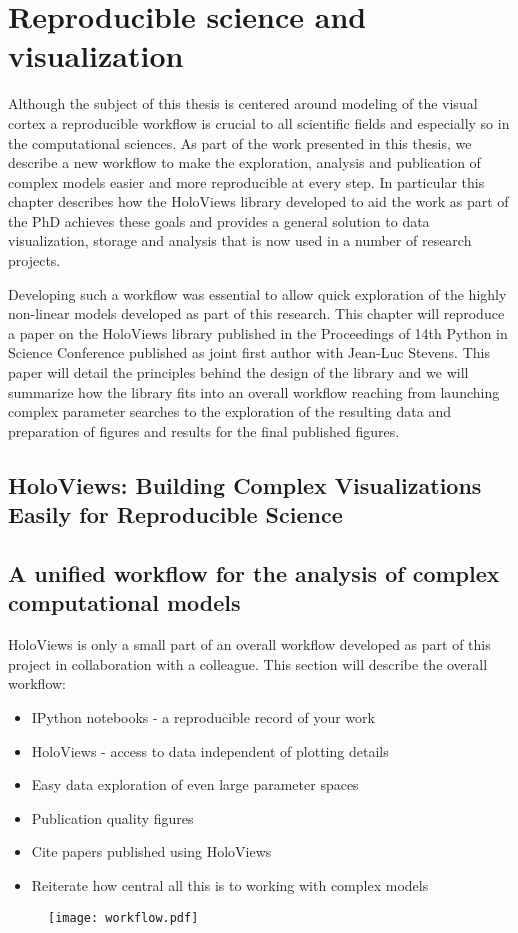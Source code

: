 \chapter{Reproducible science and visualization}

Although the subject of this thesis is centered around modeling of the
visual cortex a reproducible workflow is crucial to all scientific
fields and especially so in the computational sciences. As part of the
work presented in this thesis, we describe a new workflow to make the
exploration, analysis and publication of complex models easier and
more reproducible at every step. In particular this chapter describes
how the HoloViews library developed to aid the work as part of the PhD
achieves these goals and provides a general solution to data
visualization, storage and analysis that is now used in a number of
research projects.

Developing such a workflow was essential to allow quick exploration of
the highly non-linear models developed as part of this research.  This
chapter will reproduce a paper on the HoloViews library published in
the Proceedings of 14th Python in Science Conference published as
joint first author with Jean-Luc Stevens. This paper will detail the
principles behind the design of the library and we will summarize how
the library fits into an overall workflow reaching from launching
complex parameter searches to the exploration of the resulting data
and preparation of figures and results for the final published
figures.

\section{HoloViews: Building Complex Visualizations Easily for Reproducible Science}



\section{A unified workflow for the analysis of complex computational models}

HoloViews is only a small part of an overall workflow developed as
part of this project in collaboration with a colleague. This section
will describe the overall workflow:

\begin{itemize}
\item IPython notebooks - a reproducible record of your work
\item HoloViews - access to data independent of plotting details
\item Easy data exploration of even large parameter spaces
\item Publication quality figures
\item Cite papers published using HoloViews
\item Reiterate how central all this is to working with complex models
\end{itemize}

\begin{figure}
	\centering
        \texttt{[image: workflow.pdf]}
	\caption{}
	\label{workflow}
\end{figure}




